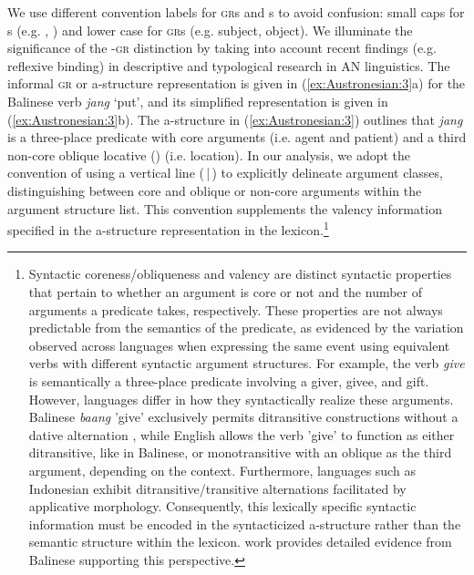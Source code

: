 \documentclass[output=paper,chinesefont]{../langscibook}
\begin{document}
We use different convention labels for \textsc{gr}s and {\GF}s to avoid confusion: small caps for {\GF}s (e.g. \SUBJ, \OBJ) and lower case for \textsc{gr}s (e.g. subject, object). We illuminate the significance of the \GF-\textsc{gr} distinction by taking into account recent findings (e.g. reflexive binding) in descriptive and typological research in AN linguistics. The informal \textsc{gr} or a-structure representation is given in (\ref{ex:Austronesian:3}a) for the Balinese verb \emph{jang} `put', and its simplified representation is given in (\ref{ex:Austronesian:3}b). The a-structure in (\ref{ex:Austronesian:3}) outlines that \emph{jang} is a three-place predicate with core arguments (i.e. agent and patient) and a third non-core oblique locative (\LOC) (i.e. location). In our analysis, we adopt the convention of using a vertical line (\,|\,) to explicitly delineate argument classes, distinguishing between core and oblique or non-core arguments within the argument structure list. This convention supplements the valency information specified in the a-structure representation in the lexicon.\footnote{Syntactic coreness/obliqueness and valency are distinct syntactic properties that pertain to whether an argument is core or not and the number of arguments a predicate takes, respectively. These properties are not always predictable from the semantics of the predicate, as evidenced by the variation observed across languages when expressing the same event using equivalent verbs with different syntactic argument structures. For example, the verb \emph{give} is semantically a three-place predicate involving a giver, givee, and gift. However, languages differ in how they syntactically realize these arguments. Balinese \emph{baang} 'give' exclusively permits ditransitive constructions without a dative alternation \citep[63--63]{Arka2003b}, while English allows the verb 'give' to function as either ditransitive, like in Balinese, or monotransitive with an oblique as the third argument, depending on the context. Furthermore, languages such as Indonesian exhibit ditransitive/transitive alternations facilitated by applicative morphology. Consequently, this lexically specific syntactic information must be encoded in the syntacticized a-structure rather than the semantic structure within the lexicon.  work provides detailed evidence from Balinese supporting this perspective.}
\end{document}

